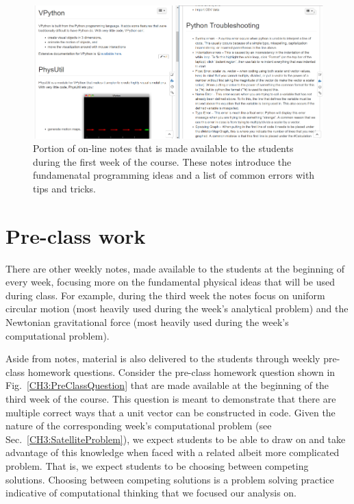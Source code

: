 \documentclass{msuphddissertation}
\begin{document}
\begin{doublespace}
\begin{figure}[ht]\centering
\includegraphics[scale=1]{images/CH3VPythonNotes.pdf}
\caption{Portion of on-line notes that is made available to the students during the first week of the course.  These notes introduce the fundamenatal programming ideas and a list of common errors with tips and tricks.}\label{CH3:VPythonNotes}
\end{figure} 

\section{Pre-class work}

There are other weekly notes, made available to the students at the beginning of every week, focusing more on the fundamental physical ideas that will be used during class.  For example, during the third week the notes focus on uniform circular motion (most heavily used during the week's analytical problem) and the Newtonian gravitational force (most heavily used during the week's computational problem).

Aside from notes, material is also delivered to the students through weekly pre-class homework questions.  Consider the pre-class homework question shown in Fig.~\ref{CH3:PreClassQuestion} that are made available at the beginning of the third week of the course.  This question is meant to demonstrate that there are multiple correct ways that a unit vector can be constructed in code.  Given the nature of the corresponding week's computational problem (see Sec.~\ref{CH3:SatelliteProblem}), we expect students to be able to draw on and take advantage of this knowledge when faced with a related albeit more complicated problem.  That is, we expect students to be choosing between competing solutions.  Choosing between competing solutions is a problem solving practice indicative of computational thinking that we focused our analysis on.


\end{doublespace}
\end{document}
